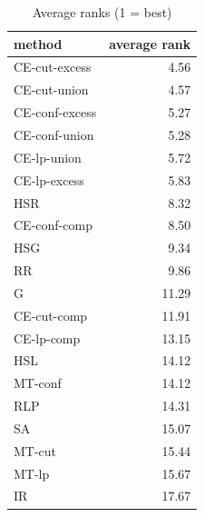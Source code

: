 \begin{table}[htbp]
\centering
\small
\caption{Average ranks (1 = best)}
\label{tab:E2_head_to_head_ranks}
\begin{tabular}{lr}
\toprule
method & average rank \\
\midrule
CE-cut-excess & 4.56 \\
CE-cut-union & 4.57 \\
CE-conf-excess & 5.27 \\
CE-conf-union & 5.28 \\
CE-lp-union & 5.72 \\
CE-lp-excess & 5.83 \\
HSR & 8.32 \\
CE-conf-comp & 8.50 \\
HSG & 9.34 \\
RR & 9.86 \\
G & 11.29 \\
CE-cut-comp & 11.91 \\
CE-lp-comp & 13.15 \\
HSL & 14.12 \\
MT-conf & 14.12 \\
RLP & 14.31 \\
SA & 15.07 \\
MT-cut & 15.44 \\
MT-lp & 15.67 \\
IR & 17.67 \\
\bottomrule
\end{tabular}
\end{table}

